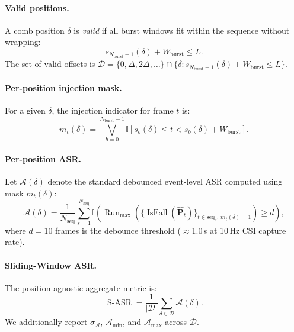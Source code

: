 \documentclass{article}
\newcommand{\IsFall}{\operatorname{IsFall}}
\newcommand{\SASR}{\operatorname{S-ASR}}
\newcommand{\Nb}{N_{\mathrm{burst}}}
\newcommand{\Wburst}{W_{\mathrm{burst}}}
\begin{document}
\paragraph{Valid positions.} A comb position $\delta$ is \emph{valid} if all burst windows fit
within the sequence without wrapping:
\begin{equation}
  s_{\Nb-1}(\delta) + \Wburst \le L.
\end{equation}
The set of valid offsets is
$\mathcal{D} = \{0, \Delta, 2\Delta, \ldots\} \cap
 \{\delta : s_{\Nb-1}(\delta) + \Wburst \le L\}$.

\paragraph{Per-position injection mask.} For a given $\delta$, the injection indicator for
frame $t$ is:
\begin{equation}
  m_t(\delta) = \bigvee_{b=0}^{\Nb-1}
    \mathbb{I}\!\left[s_b(\delta) \le t < s_b(\delta) + \Wburst\right].
\end{equation}

\paragraph{Per-position ASR.} Let $\mathcal{A}(\delta)$ denote the standard debounced
event-level ASR computed using mask $m_t(\delta)$:
\begin{equation}
  \mathcal{A}(\delta) = \frac{1}{N_{\text{seq}}} \sum_{s=1}^{N_{\text{seq}}}
    \mathbb{I}\!\left(\operatorname{Run}_{\max}\!\left(
      \bigl\{\IsFall(\hat{\mathbf{P}}_t)\bigr\}_{t \in \text{seq}_s,\, m_t(\delta)=1}
    \right) \ge d\right),
\end{equation}
where $d = 10$ frames is the debounce threshold ($\approx$1.0\,s at 10\,Hz CSI capture rate).

\paragraph{Sliding-Window ASR.} The position-agnostic aggregate metric is:
\begin{equation}
  \SASR = \frac{1}{|\mathcal{D}|} \sum_{\delta \in \mathcal{D}} \mathcal{A}(\delta).
\end{equation}
We additionally report $\sigma_{\mathcal{A}}$, $\mathcal{A}_{\min}$, and $\mathcal{A}_{\max}$
across $\mathcal{D}$.
\end{document}
